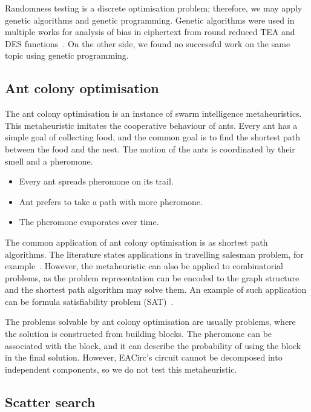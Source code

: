 \documentclass[
    digital,    %
    oneside,    %
    color,
    11pt,
    nocover,
    notable,
    nolof,
    nolot,
]{fithesis3}
\begin{document}
Randomness testing is a discrete optimisation problem; therefore, we may apply genetic algorithms and genetic programming. Genetic algorithms were used in multiple works for analysis of bias in ciphertext from round reduced TEA and DES functions~\cite{twoRoundsTea,fourRoundsTea,fiveRoundsTea,song2007cryptanalysis,husein2007genetic}. On the other side, we found no successful work on the same topic using genetic programming.


\subsection{Ant colony optimisation}
\label{subsec:opt-popul-aco}

The ant colony optimisation is an instance of swarm intelligence metaheuristics. This metaheuristic imitates the cooperative behaviour of ants. Every ant has a simple goal of collecting food, and the common goal is to find the shortest path between the food and the nest. The motion of the ants is coordinated by their smell and a pheromone.

\begin{itemize}
    \item Every ant spreads pheromone on its trail.
    \item Ant prefers to take a path with more pheromone.
    \item The pheromone evaporates over time.
\end{itemize}

The common application of ant colony optimisation is as shortest path algorithms. The literature states applications in travelling salesman problem, for example~\cite{dorigo1997ant}. However, the metaheuristic can also be applied to combinatorial problems, as the problem representation can be encoded to the graph structure and the shortest path algorithm may solve them. An example of such application can be formula satisfiability problem (SAT)~\cite{moritz2010solving}.

The problems solvable by ant colony optimisation are usually problems, where the solution is constructed from building blocks. The pheromone can be associated with the block, and it can describe the probability of using the block in the final solution. However, EACirc's circuit cannot be decomposed into independent components, so we do not test this metaheuristic.

\subsection{Scatter search}
\label{subsec:opt-popul-scatter}
\end{document}
